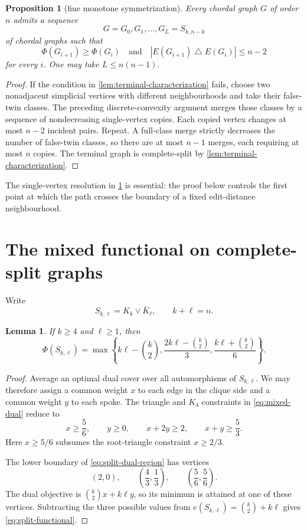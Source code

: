 \documentclass[11pt,reqno]{amsart}
\numberwithin{equation}{section}
\newtheorem{proposition}[theorem]{Proposition}
\newtheorem{lemma}[theorem]{Lemma}
\theoremstyle{definition}
\theoremstyle{remark}
\newcommand{\PhiF}{\Phi}
\begin{document}
\begin{proposition}[fine monotone symmetrization]
\label{prop:fine-symmetrization}
Every chordal graph $G$ of order $n$ admits a sequence
\[
  G=G_0,G_1,\ldots,G_L=S_{k,n-k}
\]
of chordal graphs such that
\[
  \PhiF(G_{i+1})\geq\PhiF(G_i)
  \quad\text{and}\quad
  |E(G_{i+1})\mathbin{\triangle}E(G_i)|\leq n-2
\]
for every $i$.  One may take $L\leq n(n-1)$.
\end{proposition}

\begin{proof}
If the condition in \cref{lem:terminal-characterization} fails, choose two
nonadjacent simplicial vertices with different neighbourhoods and take their
false-twin classes.  The preceding discrete-convexity argument merges those
classes by a sequence of nondecreasing single-vertex copies.  Each copied
vertex changes at most $n-2$ incident pairs.  Repeat.  A full-class merge
strictly decreases the number of false-twin classes, so there are at most
$n-1$ merges, each requiring at most $n$ copies.  The terminal graph is
complete-split by \cref{lem:terminal-characterization}.
\end{proof}

The single-vertex resolution in \cref{prop:fine-symmetrization} is essential:
the proof below controls the first point at which the path crosses the boundary
of a fixed edit-distance neighbourhood.

\section{The mixed functional on complete-split graphs}

Write
\[
  S_{k,\ell}=K_k\vee\overline K_\ell,
  \qquad k+\ell=n.
\]

\begin{lemma}\label{lem:split-functional}
If $k\geq4$ and $\ell\geq1$, then
\begin{equation}\label{eq:split-functional}
  \PhiF(S_{k,\ell})=
  \max\left\{
    k\ell-\binom k2,
    \frac{2k\ell-\binom k2}{3},
    \frac{k\ell+\binom k2}{6}
  \right\}.
\end{equation}
\end{lemma}

\begin{proof}
Average an optimal dual cover over all automorphisms of $S_{k,\ell}$.  We may
therefore assign a common weight $x$ to each edge in the clique side and a
common weight $y$ to each spoke.  The triangle and $K_4$ constraints in
\eqref{eq:mixed-dual} reduce to
\begin{equation}\label{eq:split-dual-region}
  x\geq\frac56,\qquad y\geq0,\qquad
  x+2y\geq2,\qquad x+y\geq\frac53.
\end{equation}
Here $x\geq5/6$ subsumes the root-triangle constraint $x\geq2/3$.

The lower boundary of \eqref{eq:split-dual-region} has vertices
\[
  (2,0),\qquad \left(\frac43,\frac13\right),\qquad
  \left(\frac56,\frac56\right).
\]
The dual objective is $\binom{k}{2}x+k\ell y$, so its minimum is attained at
one of these vertices.  Subtracting the three possible values from
$e(S_{k,\ell})=\binom{k}{2}+k\ell$ gives
\eqref{eq:split-functional}.
\end{proof}
\end{document}
